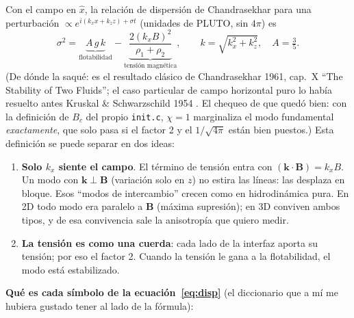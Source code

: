 \documentclass[11pt,a4paper]{article}
\begin{document}
Con el campo en $\hat{x}$, la relación de dispersión de Chandrasekhar
\cite{chandra1961} para una perturbación $\propto e^{i(k_x x+k_z z)+\sigma t}$ (unidades
de PLUTO, sin $4\pi$) es
\begin{equation}
\sigma^2 = \underbrace{A\,g\,k}_{\text{flotabilidad}}
-\underbrace{\frac{2(k_xB)^2}{\rho_1+\rho_2}}_{\text{tensión magnética}},
\qquad k=\sqrt{k_x^2+k_z^2},\quad A=\tfrac{3}{5}.
\label{eq:disp}
\end{equation}
(De dónde la saqué: es el resultado clásico de Chandrasekhar 1961, cap.~X ``The Stability
of Two Fluids''; el caso particular de campo horizontal puro lo había resuelto antes
Kruskal \& Schwarzschild 1954 \cite{kruskal1954}. El chequeo de que
quedó bien: con la definición de $B_c$ del propio \texttt{init.c}, $\chi=1$ marginaliza
el modo fundamental \emph{exactamente}, que solo pasa si el factor 2 y el $1/\sqrt{4\pi}$
están bien puestos.)
Esta definición se puede separar en dos ideas:
\begin{enumerate}
  \item \textbf{Solo $k_x$ siente el campo}. El término de tensión entra con
  $(\mathbf{k}\cdot\mathbf{B})=k_xB$. Un modo con $\mathbf{k}\perp\mathbf{B}$ (variación
  solo en $z$) no estira las líneas: las desplaza en bloque. Esos ``modos de intercambio'' crecen como en hidrodinámica pura.
  En 2D todo modo era paralelo a $\mathbf{B}$ (máxima supresión); en 3D conviven ambos
  tipos, y de esa convivencia sale la anisotropía que quiero medir.
  \item \textbf{La tensión es como una cuerda}: cada lado de la interfaz aporta su
  tensión; por eso el factor 2. Cuando la tensión le gana a la flotabilidad, el modo
  está estabilizado.
\end{enumerate}

\textbf{Qué es cada símbolo de la ecuación~\eqref{eq:disp}} (el diccionario que a mí
me hubiera gustado tener al lado de la fórmula):
\end{document}

